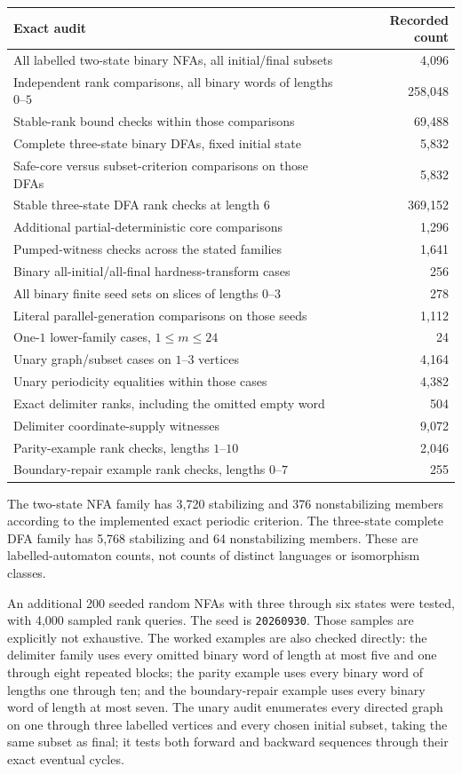 \documentclass[11pt,letterpaper]{article}
\theoremstyle{definition}
\theoremstyle{remark}
\begin{document}
\begin{center}\small
\begin{tabular}{@{}L{.67\textwidth}r@{}}
\toprule
Exact audit & Recorded count\\
\midrule
All labelled two-state binary NFAs, all initial/final subsets & 4,096\\
Independent rank comparisons, all binary words of lengths $0$--$5$ & 258,048\\
Stable-rank bound checks within those comparisons & 69,488\\
Complete three-state binary DFAs, fixed initial state & 5,832\\
Safe-core versus subset-criterion comparisons on those DFAs & 5,832\\
Stable three-state DFA rank checks at length $6$ & 369,152\\
Additional partial-deterministic core comparisons & 1,296\\
Pumped-witness checks across the stated families & 1,641\\
Binary all-initial/all-final hardness-transform cases & 256\\
All binary finite seed sets on slices of lengths $0$--$3$ & 278\\
Literal parallel-generation comparisons on those seeds & 1,112\\
One-$1$ lower-family cases, $1\le m\le24$ & 24\\
Unary graph/subset cases on $1$--$3$ vertices & 4,164\\
Unary periodicity equalities within those cases & 4,382\\
Exact delimiter ranks, including the omitted empty word & 504\\
Delimiter coordinate-supply witnesses & 9,072\\
Parity-example rank checks, lengths $1$--$10$ & 2,046\\
Boundary-repair example rank checks, lengths $0$--$7$ & 255\\
\bottomrule
\end{tabular}
\end{center}

The two-state NFA family has 3,720 stabilizing and 376 nonstabilizing
members according to the implemented exact periodic criterion. The
three-state complete DFA family has 5,768 stabilizing and 64
nonstabilizing members. These are labelled-automaton counts, not counts
of distinct languages or isomorphism classes.

An additional 200 seeded random NFAs with three through six states were
tested, with 4,000 sampled rank queries. The seed is \texttt{20260930}.
Those samples are explicitly not exhaustive. The worked examples are also
checked directly: the delimiter family uses every omitted binary word of
length at most five and one through eight repeated blocks; the parity
example uses every binary word of lengths one through ten; and the
boundary-repair example uses every binary word of length at most seven. The unary audit enumerates
every directed graph on one through three labelled vertices and every
chosen initial subset, taking the same subset as final; it tests both
forward and backward sequences through their exact eventual cycles.
\end{document}
